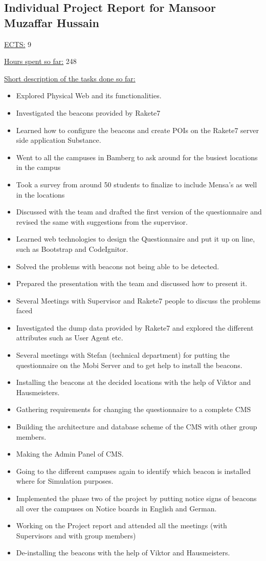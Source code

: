 \subsection{Individual Project Report for Mansoor Muzaffar Hussain}
\par \underline{ECTS:} 9
\par \underline{Hours spent so far:} 248
\par \underline{Short description of the tasks done so far:}
\begin{itemize}
	\item Explored Physical Web and its functionalities.
	\item Investigated the beacons provided by Rakete7
	\item Learned how to configure the beacons and create POIs on the Rakete7 server side application Substance.
	\item Went to all the campuses in Bamberg to ask around for the busiest locations in the campus
	\item Took a survey from around 50 students to finalize to include Mensa’s as well in the locations
	\item Discussed with the team and drafted the first version of the questionnaire and revised the same with suggestions from the supervisor.
	\item Learned web technologies to design the Questionnaire and put it up on line, such as Bootstrap and CodeIgnitor.
	\item Solved the problems with beacons not being able to be detected.
	\item Prepared the presentation with the team and discussed how to present it.
	\item Several Meetings with Supervisor and Rakete7 people to discuss the problems faced
	\item Investigated the dump data provided by Rakete7 and explored the different attributes such as User Agent etc.
	\item Several meetings with Stefan (technical department) for putting the questionnaire on the Mobi Server and to get help to install the beacons.
	\item Installing the beacons at the decided locations with the help of Viktor and Hausmeisters.
	\item Gathering requirements for changing the questionnaire to a complete CMS
	\item Building the architecture and database scheme of the CMS with other group members.
	\item Making the Admin Panel of CMS.
	\item Going to the different campuses again to identify which beacon is installed where for Simulation purposes.
	\item Implemented the phase two of the project by putting notice signs of beacons all over the campuses on Notice boards in English and German.
	\item Working on the Project report and attended all the meetings (with Supervisors and with group members)
	\item De-installing the beacons with the help of Viktor and Hausmeisters.
\end{itemize}

